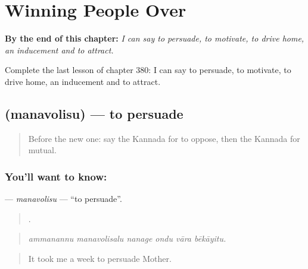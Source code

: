 
\chapter{Winning People Over}
\label{ch:ka-winning-people-over}

\begin{chapteropening}
\textbf{By the end of this chapter:} \emph{I can say to persuade, to motivate, to drive home, an inducement and to attract.}

Complete the last lesson of chapter 380: I can say to persuade, to motivate, to drive home, an inducement and to attract.
\end{chapteropening}

\section[\texorpdfstring{\kn{ಮನವೊಲಿಸು} (manavolisu)}{ಮನವೊಲಿಸು (manavolisu)}]{ (manavolisu) — to persuade}

\label{lesson:KA-C380-manavolisu}



\begin{quote}
Before the new one: say the Kannada for to oppose, then the Kannada for mutual.
\end{quote}

\subsection*{You'll want to know: }
\textbf{} — \emph{manavolisu} — \textquotedblleft{}to persuade\textquotedblright{}.

\begin{quote}
     .
\end{quote}

\begin{quote}
\emph{ammanannu manavolisalu nanage ondu vāra bēkāyitu.}
\end{quote}

\begin{quote}
It took me a week to persuade Mother.
\end{quote}

